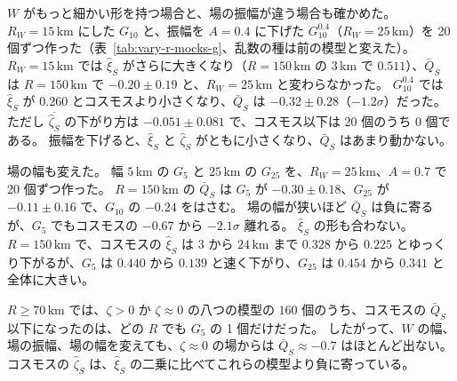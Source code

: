 \documentclass[a4paper,11pt]{ltjsarticle}
\begin{document}
$W$ がもっと細かい形を持つ場合と、場の振幅が違う場合も確かめた。
$R_W = 15\,\mathrm{km}$ にした $G_{10}$ と、振幅を $A = 0.4$ に下げた $G_{10}^{0.4}$（$R_W = 25\,\mathrm{km}$）を 20 個ずつ作った（表~\ref{tab:vary-r-mocks-g}、乱数の種は前の模型と変えた）。
$R_W = 15\,\mathrm{km}$ では $\hat\xi_S$ がさらに大きくなり（$R = 150\,\mathrm{km}$ の $3\,\mathrm{km}$ で $0.511$）、$\bar Q_S$ は $R = 150\,\mathrm{km}$ で $-0.20 \pm 0.19$ と、$R_W = 25\,\mathrm{km}$ と変わらなかった。
$G_{10}^{0.4}$ では $\hat\xi_S$ が $0.260$ とコスモスより小さくなり、$\bar Q_S$ は $-0.32 \pm 0.28$（$-1.2\sigma$）だった。
ただし $\overline{\hat\zeta_S}$ の下がり方は $-0.051 \pm 0.081$ で、コスモス以下は 20 個のうち $0$ 個である。
振幅を下げると、$\hat\xi_S$ と $\hat\zeta_S$ がともに小さくなり、$\bar Q_S$ はあまり動かない。

場の幅も変えた。
幅 $5\,\mathrm{km}$ の $G_5$ と $25\,\mathrm{km}$ の $G_{25}$ を、$R_W = 25\,\mathrm{km}$、$A = 0.7$ で 20 個ずつ作った。
$R = 150\,\mathrm{km}$ の $\bar Q_S$ は $G_5$ が $-0.30 \pm 0.18$、$G_{25}$ が $-0.11 \pm 0.16$ で、$G_{10}$ の $-0.24$ をはさむ。
場の幅が狭いほど $\bar Q_S$ は負に寄るが、$G_5$ でもコスモスの $-0.67$ から $-2.1\sigma$ 離れる。
$\hat\xi_S$ の形も合わない。
$R = 150\,\mathrm{km}$ で、コスモスの $\hat\xi_S$ は $3$ から $24\,\mathrm{km}$ まで $0.328$ から $0.225$ とゆっくり下がるが、$G_5$ は $0.440$ から $0.139$ と速く下がり、$G_{25}$ は $0.454$ から $0.341$ と全体に大きい。

$R \ge 70\,\mathrm{km}$ では、$\zeta > 0$ か $\zeta \approx 0$ の八つの模型の $160$ 個のうち、コスモスの $\bar Q_S$ 以下になったのは、どの $R$ でも $G_5$ の 1 個だけだった。
したがって、$W$ の幅、場の振幅、場の幅を変えても、$\zeta \approx 0$ の場からは $\bar Q_S \approx -0.7$ はほとんど出ない。
コスモスの $\hat\zeta_S$ は、$\hat\xi_S$ の二乗に比べてこれらの模型より負に寄っている。

\begin{table}[t]
  \centering
  \caption{式~\eqref{eq:q-bar} の $\bar Q_S$。
    コスモスと、表~\ref{tab:vary-r-mocks}・\ref{tab:vary-r-mocks-g}・\ref{tab:vary-r-mocks-skew} と同じ模擬データ（各 20 個、模型の後ろの括弧の中は $R_W$ [km]）。
    模擬データは一つごとに $\bar Q_S$ を求め、その平均と標準偏差を書いた。
    $hI_1'$ は $hI_1$（\ref{sec:catchment} 節）を別の乱数の種で作り直したもの。
    $R \le 25\,\mathrm{km}$ は分母が小さく値が使えないので、載せていない。}
  \label{tab:vary-r-q}
  \footnotesize
  
\end{table}
\end{document}
